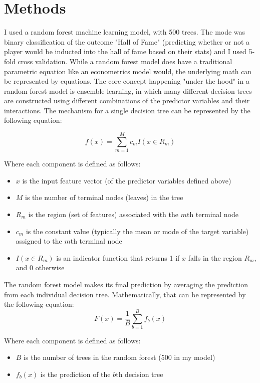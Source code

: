 \documentclass[12pt,english]{article}
\begin{document}
\section{Methods}\label{sec:methods}
I used a random forest machine learning model, with 500 trees. The mode was binary classification of the outcome "Hall of Fame" (predicting whether or not a player would be inducted into the hall of fame based on their stats) and I used 5-fold cross validation. While a random forest model does have a traditional parametric equation like an econometrics model would, the underlying math can be represented by equations. The core concept happening "under the hood" in a random forest model is ensemble learning, in which many different decision trees are constructed using different combinations of the predictor variables and their interactions. The mechanism for a single decision tree can be represented by the following equation:

\begin{equation}
f(x) = \sum_{m=1}^{M} c_m I(x \in R_m)
\end{equation}

Where each component is defined as follows:
\begin{itemize}
    \item $x$ is the input feature vector (of the predictor variables defined above)
    \item $M$ is the number of terminal nodes (leaves) in the tree
    \item $R_m$ is the region (set of features) associated with the $m$th terminal node
    \item $c_m$ is the constant value (typically the mean or mode of the target variable) assigned to the $m$th terminal node
    \item $I(x \in R_m)$ is an indicator function that returns 1 if $x$ falls in the region $R_m$, and 0 otherwise    
\end{itemize}

The random forest model makes its final prediction by averaging the prediction from each individual decision tree. Mathematically, that can be represented by the following equation:
\begin{equation}
    F(x) = \frac{1}{B} \sum_{b=1}^{B} f_b(x)
\end{equation}

Where each component is defined as follows:
\begin{itemize}
    \item $B$ is the number of trees in the random forest (500 in my model)
    \item $f_b(x)$ is the prediction of the $b$th decision tree
\end{itemize}
\end{document}
